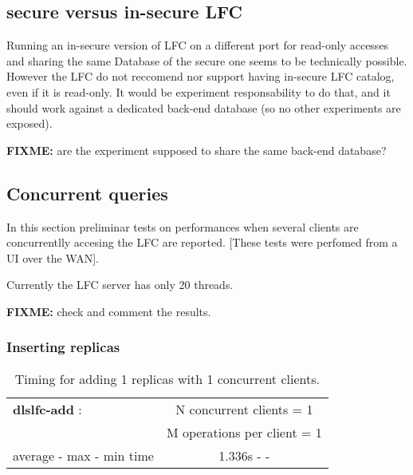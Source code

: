 \documentclass[pdftex]{cmspaper}
\begin{document}
\subsection{secure versus in-secure LFC}

Running an in-secure version of LFC on a different port for read-only accesses
and sharing the same Database of the secure one seems to be technically possible.
However the LFC do not reccomend nor support having in-secure LFC catalog,
even if it is read-only. It would be experiment responsability to do that, and it 
should work against a dedicated back-end database (so no other experiments are exposed).

{\bf FIXME: } are the experiment supposed to share the same back-end database?


\subsection{ Concurrent queries }
 
In this section preliminar tests on performances when several clients 
are concurrentlly accesing the LFC are reported.
[These tests were perfomed from a UI over the WAN].

Currently the LFC server has only 20 threads.

{\bf FIXME:} check and comment the results.  

\subsubsection{ Inserting replicas}

\begin{table}[!htbp]
\begin{center}
 \begin{tabular}{|l|c|}         \hline
   {\bf dlslfc-add} : & N concurrent clients = 1  \\ & M operations per client = 1\\ \hline
    average - max - min time     & 1.336s - - \\ \hline
\end{tabular}
\caption {Timing for adding 1 replicas with 1 concurrent clients.}\label{dlslfc-add}
\end{center}
\end{table}
\end{document}

